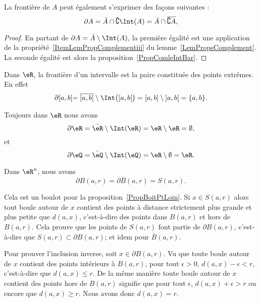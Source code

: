 \begin{lemma}
	La frontière de $A$ peut également s'exprimer des façons suivantes :
	\begin{equation}
		\partial A= \bar A\cap\complement\Int(A)=\bar A\cap\overline{ \complement A },
	\end{equation}
\end{lemma}

\begin{proof}
	En partant de $\partial A=\bar A\setminus \Int(A)$, la première égalité est une application de la propriété~\ref{ItemLemPropComplementiii} du lemme~\ref{LemPropsComplement}. La seconde égalité est alors la proposition~\ref{PropComleIntBar}.
\end{proof}

\begin{example}
	Dans $\eR$, la frontière d'un intervalle est la paire constituée des points extrêmes. En effet
	\begin{equation}
		\partial\mathopen[ a , b [=\overline{ \mathopen[ a , b [ }\setminus\Int\big( \mathopen[ a , b [ \big)=\mathopen[ a , b \mathclose]\setminus\mathopen] a , b \mathclose[=\{ a,b \}.
	\end{equation}

	Toujours dans $\eR$ nous avons
	\begin{equation}
		\partial\eR=\bar\eR\setminus\Int(\eR)=\eR\setminus\eR=\emptyset,
	\end{equation}
	et
	\begin{equation}
		\partial\eQ=\bar\eQ\setminus\Int(\eQ)=\eR\setminus\emptyset=\eR.
	\end{equation}
\end{example}


\begin{example}
	Dans $\eR^n$, nous avons
	\begin{equation}
		\partial B(a,r)=\partial\bar B(a,r)=S(a,r).
	\end{equation}

	Cela est un boulot pour la proposition~\ref{PropBoitPtLoin}. Si \( x\in S(a,r)\) alors tout boule autour de \( x\) contient des points à distance strictement plus grande et plus petite que \( d(a,x)\), c'est-à-dire des points dans \( B(a,r)\) et hors de \( B(a,r)\). Cela prouve que les points de \( S(a,r)\) font partie de \( \partial B(a,r)\), c'est-à-dire que \( S(a,r)\subset \partial B(a,r)\); et idem pour \( \bar B(a,r)\).

	Pour prouver l'inclusion inverse, soit \( x\in \partial B(a,r)\). Vu que toute boule autour de \( x\) contient des points intérieurs à \( B(a,r)\), pour tout \( \epsilon>0\), \( d(a,x)-\epsilon< r \), c'est-à-dire que \( d(a,x)\leq r\). De la même manière toute boule autour de \( x\) contient des points hors de \( B(a,r)\) signifie que pour tout \( \epsilon\), \( d(a,x)+\epsilon>r\) ou encore que \( d(a,x)\geq r\). Nous avons donc \( d(a,x)=r\).
\end{example}

